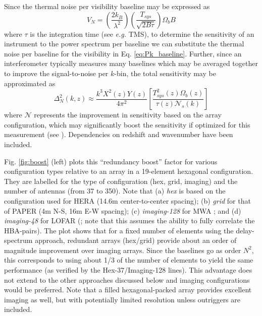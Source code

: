 \documentclass[preprint,11pt]{aastex}
\begin{document}
Since the thermal noise per visibility baseline may be expressed as
\begin{equation}
V_N = \left(\frac{2k_B}{\lambda^2}\right)\left(\frac{T_{sys}}{\sqrt{2B\tau}}\right)\Omega_b B
\label{eq:sensitivity_per_baseline}
\end{equation}
where $\tau$ is the integration time (see {\em e.g.} TMS),
to determine the sensitivity of an instrument to the power spectrum per baseline we can substitute the thermal noise per baseline for the visibility in Eq. \ref{eq:Pk_baseline}.  Further, since an interferometer typically measures many baselines which may be averaged together to improve the signal-to-noise per $k$-bin, the total sensitivity may be approximated as
\begin{equation}
\Delta^2_N (k,z)\approx \frac{k^3X^2(z)Y(z)}{4\pi^2} \left[\frac{T_{sys}^2(z)\Omega_b(z) }{\tau(z) \mathcal{N}_s(k)}\right]
\label{eq:sensitivity}
\end{equation}
where $\mathcal{N}$ represents the improvement in sensitivity based on the array configuration, which may significantly boost the sensitivity if optimized for this measurement (see \citealt{parsons_et_al2012b}).  Dependencies on redshift and wavenumber have been included.

Fig. \ref{fig:boost} (left) plots this ``redundancy boost'' factor for various configuration types relative to an array in a 19-element hexagonal configuration.  They are labelled for the type of configuration (hex, grid, imaging) and the number of antennas (from 37 to 350).  Note that (a) {\em hex} is based on the configuration used for HERA (14.6m center-to-center spacing); (b) {\em grid} for that of PAPER (4m N-S, 16m E-W spacing); (c) {\em imaging-128} for MWA \citep{tingay_et_al2013}; and (d) {\em imaging-48} for LOFAR (\citealt{2013A&A...556A...2V}; note that this assumes the ability to fully correlate the HBA-pairs).  The plot shows that for a fixed number of elements using the delay-spectrum approach, redundant arrays (hex/grid) provide about an order of magnitude improvement over imaging arrays.  Since the baselines go as order $N^2$, this corresponds to using about 1/3 of the number of elements to yield the same performance (as verified by the Hex-37/Imaging-128 lines).  This advantage does not extend to the other approaches discussed below and imaging configurations would be preferred.  Note that a filled hexagonal-packed array provides excellent imaging as well, but with potentially limited resolution unless outriggers are included.
\end{document}
